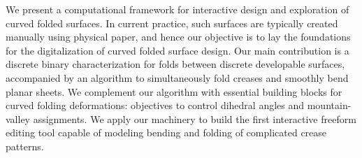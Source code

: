 We present a computational framework for interactive design and exploration of curved folded surfaces. In current practice, such surfaces are typically created manually using physical paper, and hence our objective is to lay the foundations for the digitalization of curved folded surface design. 
Our main contribution is a discrete binary characterization for folds between discrete developable surfaces, accompanied by an algorithm to simultaneously fold creases and smoothly bend planar sheets. We complement our algorithm with essential building blocks for curved folding deformations: objectives to control dihedral angles and mountain-valley assignments. We apply our machinery to build the first interactive freeform editing tool capable of modeling bending and folding of complicated crease patterns.



